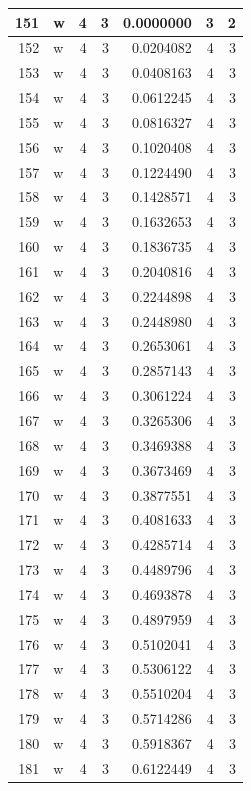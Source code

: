 \documentclass[
  letterpaper,
  DIV=11,
  numbers=noendperiod]{scrreprt}
\begin{document}
\begin{table}
\begin{tabular}[t]{r|l|r|r|r|r|r}
\hline
151 & w & 4 & 3 & 0.0000000 & 3 & 2\\
\hline
152 & w & 4 & 3 & 0.0204082 & 4 & 3\\
\hline
153 & w & 4 & 3 & 0.0408163 & 4 & 3\\
\hline
154 & w & 4 & 3 & 0.0612245 & 4 & 3\\
\hline
155 & w & 4 & 3 & 0.0816327 & 4 & 3\\
\hline
156 & w & 4 & 3 & 0.1020408 & 4 & 3\\
\hline
157 & w & 4 & 3 & 0.1224490 & 4 & 3\\
\hline
158 & w & 4 & 3 & 0.1428571 & 4 & 3\\
\hline
159 & w & 4 & 3 & 0.1632653 & 4 & 3\\
\hline
160 & w & 4 & 3 & 0.1836735 & 4 & 3\\
\hline
161 & w & 4 & 3 & 0.2040816 & 4 & 3\\
\hline
162 & w & 4 & 3 & 0.2244898 & 4 & 3\\
\hline
163 & w & 4 & 3 & 0.2448980 & 4 & 3\\
\hline
164 & w & 4 & 3 & 0.2653061 & 4 & 3\\
\hline
165 & w & 4 & 3 & 0.2857143 & 4 & 3\\
\hline
166 & w & 4 & 3 & 0.3061224 & 4 & 3\\
\hline
167 & w & 4 & 3 & 0.3265306 & 4 & 3\\
\hline
168 & w & 4 & 3 & 0.3469388 & 4 & 3\\
\hline
169 & w & 4 & 3 & 0.3673469 & 4 & 3\\
\hline
170 & w & 4 & 3 & 0.3877551 & 4 & 3\\
\hline
171 & w & 4 & 3 & 0.4081633 & 4 & 3\\
\hline
172 & w & 4 & 3 & 0.4285714 & 4 & 3\\
\hline
173 & w & 4 & 3 & 0.4489796 & 4 & 3\\
\hline
174 & w & 4 & 3 & 0.4693878 & 4 & 3\\
\hline
175 & w & 4 & 3 & 0.4897959 & 4 & 3\\
\hline
176 & w & 4 & 3 & 0.5102041 & 4 & 3\\
\hline
177 & w & 4 & 3 & 0.5306122 & 4 & 3\\
\hline
178 & w & 4 & 3 & 0.5510204 & 4 & 3\\
\hline
179 & w & 4 & 3 & 0.5714286 & 4 & 3\\
\hline
180 & w & 4 & 3 & 0.5918367 & 4 & 3\\
\hline
181 & w & 4 & 3 & 0.6122449 & 4 & 3\\

\end{tabular}
\end{table}
\end{document}
